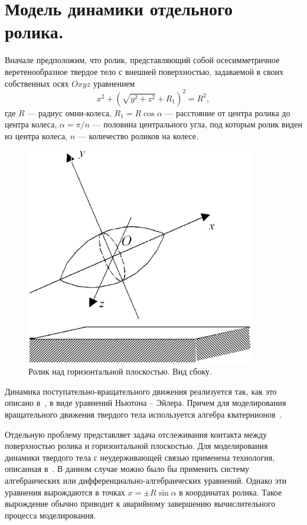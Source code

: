 \documentclass[12pt,a4paper]{article}
\begin{document}
\section{Модель динамики отдельного ролика.\ }
\label{sec3}
Вначале предположим, что ролик, представляющий собой осесимметричное 
веретенообразное твердое тело с внешней поверхностью, задаваемой в своих 
собственных осях $Oxyz$ уравнением
\begin{equation}
x^2+\left(\sqrt{y^2+z^2}+R_1\right) ^2=R^2,
\label{3_1}
\end{equation}
где $R$ --- радиус омни-колеса, $R_1=R\cos{\alpha }$ --- расстояние от центра
ролика до центра колеса, $\alpha =\pi /n$ --- половина центрального угла, под
которым ролик виден из центра колеса, $n$ --- количество роликов на колесе.
\begin{figure}[htb]
\centering\includegraphics[width=10cm]{Roller.eps}
\caption{Ролик над горизонтальной плоскостью. Вид сбоку.}
\label{Roller}
\end{figure}

Динамика поступательно-вращательного движения реализуется так, как это описано
в~\cite{Kosenko2007}, в виде уравнений Ньютона -- Эйлера. Причем для 
моделирования вращательного движения твердого тела используется алгебра 
кватернионов~\cite{Kosenko}.

Отдельную проблему представляет задача отслеживания контакта между поверхностью 
ролика и горизонтальной плоскостью. Для моделирования динамики твердого тела с
неудерживающей связью применена технология, описанная в~\cite{Kosenko2006}. В
данном случае можно было бы применить систему алгебраических или 
дифференциально-алгебраических уравнений. Однако эти уравнения вырождаются в 
точках $x=\pm R\sin\alpha $ в координатах ролика. Такое вырождение обычно 
приводит к аварийному завершению вычислительного процесса моделирования.
\end{document}
